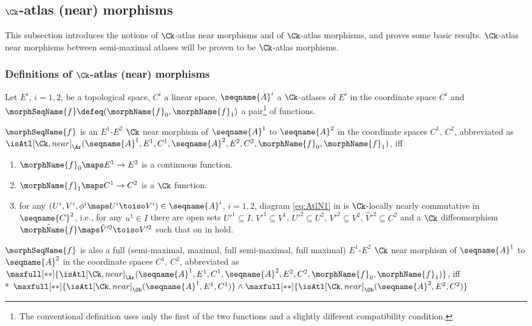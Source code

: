 \documentclass{article}
\begin{document}
\subsection{$\Ck$-atlas (near) morphisms}
This subsection introduces the notions of $\Ck$-atlas near
morphisms and of $\Ck$-atlas morphisms, and proves some basic
results. $\Ck$-atlas near morphisms between semi-maximal atlases
will be proven to be $\Ck$-atlas morphisms.

\subsubsection{Definitions of \ensuremath{\Ck}-atlas (near) morphisms}
\begin{definition}
\label{def:Ck-ATLmorphnear}
Let $E^i$, $i=1,2$, be a topological space, $C^i$ a linear space,
$\seqname{A}^i$ a $\Ck$-atlases of $E^i$ in the coordinate space $C^i$ and
$\morphSeqName{f} \defeq (\morphName{f}_0, \morphName{f}_1)$ a
pair\footnote{
  The conventional definition uses only the first of the two
  functions and a slightly different compatibility condition.
}
of functions.

$\morphSeqName{f}$ is an $E^1$-$E^2$ $\Ck$ near morphism of
$\seqname{A}^1$ to $\seqname{A}^2$ in the coordinate spaces $C^1$,
$C^2$, abbreviated as
$
\isAtl[\Ck,near]_\Ar
  (
    \seqname{A}^1,
    E ^1,
    C^1,
    \seqname{A}^2,
    E^2,
    C^2,
    \morphName{f}_0,
    \morphName{f}_1
  )
$,
iff
\begin{enumerate}
\item $\morphName{f}_0 \maps E^1 \to E^2$ is a continuous function.
\item $\morphName{f}_1 \maps C^1 \to C^2$ is a $\Ck$ function.
\item for any
$(U^i, V^i, \phi^i \maps U^i \toiso V^i) \in \seqname{A}^i$, $i=1,2$,
diagram  \eqref{eq:AtlN1} in
{
  \showlabelsinline
}
is $\Ck$-locally nearly commutative in $\seqname{C}^2$, i.e., for any
$u^1 \in I$ there are open sets $U'^1 \subseteq I$, $V'^1 \subseteq V^1$,
$U'^2 \subseteq U^2$, $V'^2 \subseteq V^2$,
$\hat{V}'^2 \subseteq C^2$ and a $\Ck$ diffeomorphism
$\hat{\morphName{f}} \maps \hat{V}'^2 \toiso V'^2$ such that
 on
 in
{
  \showlabelsinline
   hold.
}
\end{enumerate}

$\morphSeqName{f}$ is also a
full (semi-maximal, maximal, full semi-maximal, full maximal)
$E^1$-$E^2$ $\Ck$ near morphism of
$\seqname{A}^1$ to $\seqname{A}^2$ in the coordinate spaces $C^1$,
$C^2$, abbreviated as
$
  \maxfull[**]
    {
      \isAtl[\Ck,near]_\Ar
        (
          \seqname{A}^1, E^1, C^1,
          \seqname{A}^2, E^2, C^2,
          \morphName{f}_0, \morphName{f}_1
        )
    }
$,
iff \\*
$
  \maxfull[**]
    {
      \isAtl[\Ck,near]_\Ob
        (
          \seqname{A}^1, E^1, C^1
        )
    }
  \land
  \maxfull[**]
    {
      \isAtl[\Ck,near]_\Ob
        (
          \seqname{A}^2, E^2, C^2
        )
    }
$


\end{definition}
\end{document}
